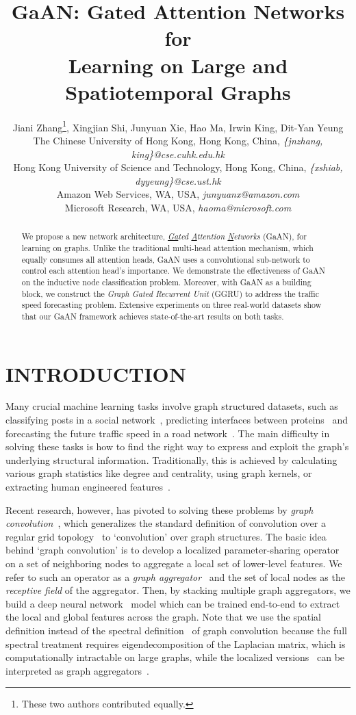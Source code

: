 \documentclass{article}
\title{GaAN: Gated Attention Networks for \\Learning on Large and Spatiotemporal Graphs}
\author{Jiani Zhang\thanks{\quad These two authors contributed equally.}, Xingjian Shi\footnotemark[1], Junyuan Xie, Hao Ma, Irwin King, Dit-Yan Yeung\\
	{\small The Chinese University of Hong Kong, Hong Kong, China,}
	\emph{\small \{jnzhang, king\}@cse.cuhk.edu.hk}\\
	{\small Hong Kong University of Science and Technology, Hong Kong, China,}
	\emph{\small \{xshiab, dyyeung\}@cse.ust.hk}\\
	{\small Amazon Web Services, WA, USA,}
	\emph{\small junyuanx@amazon.com}\\
	{\small Microsoft Research, WA, USA,}
	\emph{\small haoma@microsoft.com }
}
\begin{document}
	
	\maketitle
	
	\begin{abstract}
		We propose a new network architecture, \emph{\underline{Ga}ted \underline{A}ttention \underline{N}etworks} (GaAN), for learning on graphs. Unlike the traditional multi-head attention mechanism, which equally consumes all attention heads, GaAN uses a convolutional sub-network to control each attention head's importance. We demonstrate the effectiveness of GaAN on the inductive node classification problem. Moreover, with GaAN as a building block, we construct the \emph{Graph Gated Recurrent Unit} (GGRU) to address the traffic speed forecasting problem. Extensive experiments on three real-world datasets show that our GaAN framework achieves state-of-the-art results on both tasks.
	\end{abstract}
	
	\section{INTRODUCTION}
	
	Many crucial machine learning tasks involve graph structured datasets, such as classifying posts in a social network~\citep{hamilton2017inductive}, predicting interfaces between proteins~\citep{fout2017protein} and forecasting the future traffic speed in a road network~\citep{li2017graph}. The main difficulty in solving these tasks is how to find the right way to express and exploit the graph's underlying structural information. Traditionally, this is achieved by calculating various graph statistics like degree and centrality, using graph kernels, or extracting human engineered features~\citep{hamilton2017representation}.
	
	Recent research, however, has pivoted to solving these problems by \emph{graph convolution}~\citep{duvenaud2015convolutional,atwood2016diffusion,kipf2017semi,fout2017protein,hamilton2017inductive,velivckovic2017graph, li2017graph}, which generalizes the standard definition of convolution over a regular grid topology~\citep{gehring17a, krizhevsky2012imagenet}
to `convolution' over graph structures.  The basic idea behind `graph convolution' is to develop a localized parameter-sharing operator on a set of neighboring nodes to aggregate a local set of lower-level features. We refer to such an operator as a {\em graph aggregator}~\citep{hamilton2017inductive} and the set of local nodes as the {\em receptive field} of the aggregator. Then, by stacking multiple graph aggregators, we build a deep neural network~\citep{lecun2015deep} model which can be trained end-to-end to extract the local and global features across the graph.
	Note that we use the spatial definition instead of the spectral definition~\citep{hammond2011wavelets, bruna2014spectral} of graph convolution because the full spectral treatment requires eigendecomposition of the Laplacian matrix, which is computationally intractable on large graphs, while the localized versions~\citep{defferrard2016convolutional,kipf2017semi} can be interpreted as graph aggregators~\citep{hamilton2017inductive}.
	
\end{document}
